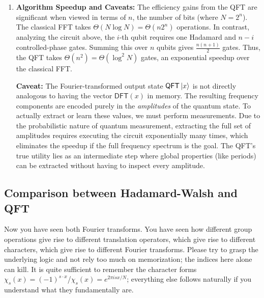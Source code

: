 \begin{enumerate}
    \item \textbf{Algorithm Speedup and Caveats:}
    The efficiency gains from the QFT are significant when viewed in terms of $n$, the number of bits (where $N = 2^n$). The classical FFT takes $\Theta(N \log N) = \Theta(n2^n)$ operations. In contrast, analyzing the circuit above, the $i$-th qubit requires one Hadamard and $n-i$ controlled-phase gates. Summing this over $n$ qubits gives $\frac{n(n+1)}{2}$ gates. Thus, the QFT takes $\Theta(n^2) = \Theta(\log^2 N)$ gates, an exponential speedup over the classical FFT.
    
    \textbf{Caveat:} The Fourier-transformed output state $\mathsf{QFT}\ket{x}$ is not directly analogous to having the vector $\mathsf{DFT}(x)$ in memory. The resulting frequency components are encoded purely in the \textit{amplitudes} of the quantum state. To actually extract or learn these values, we must perform measurements. Due to the probabilistic nature of quantum measurement, extracting the full set of amplitudes requires executing the circuit exponentially many times, which eliminates the speedup if the full frequency spectrum is the goal. The QFT's true utility lies as an intermediate step where global properties (like periods) can be extracted without having to inspect every amplitude.
\end{enumerate}

\subsection{Comparison between Hadamard-Walsh and QFT}

Now you have seen both Fourier transforms. You have seen how different group operations give rise to different translation operators, which give rise to different characters, which give rise to different Fourier transforms. Please try to grasp the underlying logic and not rely too much on memorization; the indices here alone can kill. It is quite sufficient to remember the character forms $\chi_s(x)=(-1)^{s \cdot x}$/$\chi_s(x)=e^{2\pi isx/N}$; everything else follows naturally if you understand what they fundamentally are.

